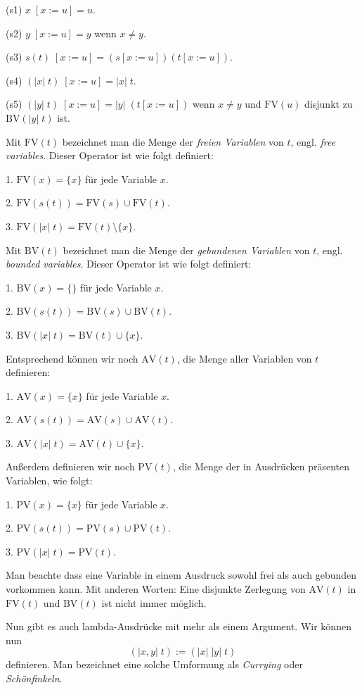 \documentclass[a4paper,11pt,fleqn,twocolumn,twoside]{article}
\numberwithin{equation}{section}
\begin{document}
(s1) $x\;[x:=u] = u$.

(s2) $y\;[x:=u] = y$ wenn $x\ne y$.

(s3) $s(t)\;[x:=u] = (s[x:=u])(t[x:=u])$.

(s4) $(|x|\;t)\;[x:=u] = |x|\;t$.

(s5) $(|y|\;t)\;[x:=u] = |y|\;(t[x:=u])$ wenn $x\ne y$
und $\mathrm{FV}(u)$ disjunkt zu $\mathrm{BV}(|y|\;t)$ ist.

Mit $\mathrm{FV}(t)$ bezeichnet man die Menge der \emph{freien Variablen}
von $t$, engl. \emph{free variables}. Dieser Operator ist wie folgt
definiert:

1. $\mathrm{FV}(x) = \{x\}$ für jede Variable $x$.

2. $\mathrm{FV}(s(t)) = \mathrm{FV}(s)\cup\mathrm{FV}(t)$.

3. $\mathrm{FV}(|x|\; t) = \mathrm{FV}(t)\setminus\{x\}$.

\noindent
Mit $\mathrm{BV}(t)$ bezeichnet man die Menge der \emph{gebundenen
Variablen} von $t$, engl. \emph{bounded variables}.
Dieser Operator ist wie folgt definiert:

1. $\mathrm{BV}(x) = \{\}$ für jede Variable $x$.

2. $\mathrm{BV}(s(t)) = \mathrm{BV}(s)\cup\mathrm{BV}(t)$.

3. $\mathrm{BV}(|x|\; t) = \mathrm{BV}(t)\cup\{x\}$.

\noindent
Entsprechend können wir noch $\mathrm{AV}(t)$, die Menge aller
Variablen von $t$ definieren:

1. $\mathrm{AV}(x) = \{x\}$ für jede Variable $x$.

2. $\mathrm{AV}(s(t)) = \mathrm{AV}(s)\cup\mathrm{AV}(t)$.

3. $\mathrm{AV}(|x|\; t) = \mathrm{AV}(t)\cup\{x\}$.

\noindent
Außerdem definieren wir noch $\mathrm{PV}(t)$, die Menge der
in Ausdrücken präsenten Variablen, wie folgt:

1. $\mathrm{PV}(x) = \{x\}$ für jede Variable $x$.

2. $\mathrm{PV}(s(t)) = \mathrm{PV}(s)\cup\mathrm{PV}(t)$.

3. $\mathrm{PV}(|x|\; t) = \mathrm{PV}(t)$.

\noindent
Man beachte dass eine Variable in einem Ausdruck sowohl
frei als auch gebunden vorkommen kann. Mit anderen
Worten: Eine disjunkte Zerlegung von $\mathrm{AV}(t)$
in $\mathrm{FV}(t)$ und $\mathrm{BV}(t)$ ist nicht immer möglich.

Nun gibt es auch lambda-Ausdrücke mit mehr als einem Argument.
Wir können nun
\begin{equation}
(|x,y|\; t) := (|x|\;|y|\;t)
\end{equation}
definieren. Man bezeichnet eine solche Umformung als \emph{Currying}
oder \emph{Schönfinkeln}.
\end{document}
